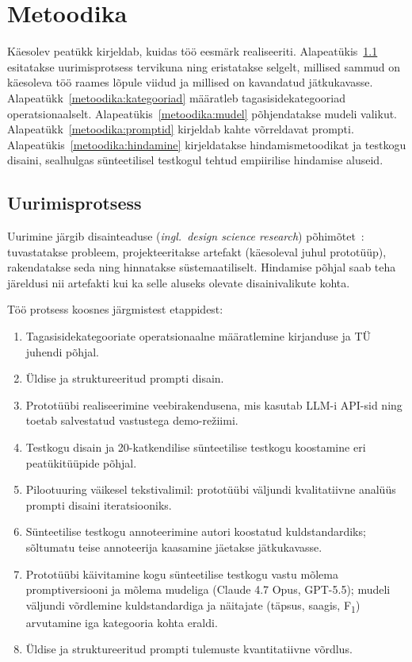\section{Metoodika} \label{metoodika}

Käesolev peatükk kirjeldab, kuidas töö eesmärk realiseeriti. Alapeatükis~\ref{metoodika:protsess} esitatakse uurimisprotsess tervikuna ning eristatakse selgelt, millised sammud on käesoleva töö raames lõpule viidud ja millised on kavandatud jätkukavasse. Alapeatükk~\ref{metoodika:kategooriad} määratleb tagasisidekategooriad operatsionaalselt. Alapeatükis~\ref{metoodika:mudel} põhjendatakse mudeli valikut. Alapeatükk~\ref{metoodika:promptid} kirjeldab kahte võrreldavat prompti. Alapeatükis~\ref{metoodika:hindamine} kirjeldatakse hindamismetoodikat ja testkogu disaini, sealhulgas sünteetilisel testkogul tehtud empiirilise hindamise aluseid.

\subsection{Uurimisprotsess} \label{metoodika:protsess}

Uurimine järgib disain\-teaduse (\emph{ingl.\ design science research}) põhimõtet~\cite{hevner_design_2004}: tuvastatakse probleem, projekteeritakse artefakt (käesoleval juhul prototüüp), rakendatakse seda ning hinnatakse süstemaatiliselt. Hindamise põhjal saab teha järeldusi nii artefakti kui ka selle aluseks olevate disainivalikute kohta.

Töö protsess koosnes järgmistest etappidest:
\begin{enumerate}
    \item Tagasisidekategooriate operatsionaalne määratlemine kirjanduse ja TÜ juhendi põhjal.
    \item Üldise ja struktureeritud prompti disain.
    \item Prototüübi realiseerimine veebirakendusena, mis kasutab LLM-i API-sid ning toetab salvestatud vastustega demo-režiimi.
    \item Testkogu disain ja 20-katkendilise sünteetilise testkogu koostamine eri peatükitüüpide põhjal.
    \item Pilootuuring väikesel tekstivalimil: prototüübi väljundi kvalitatiivne analüüs prompti disaini iteratsiooniks.
    \item Sünteetilise testkogu annoteerimine autori koostatud kuldstandardiks; sõltumatu teise annoteerija kaasamine jäetakse jätkukavasse.
    \item Prototüübi käivitamine kogu sünteetilise testkogu vastu mõlema promptiversiooni ja mõlema mudeliga (Claude 4.7 Opus, GPT-5.5); mudeli väljundi võrdlemine kuldstandardiga ja näitajate (täpsus, saagis, F\textsubscript{1}) arvutamine iga kategooria kohta eraldi.
    \item Üldise ja struktureeritud prompti tulemuste kvantitatiivne võrdlus.
\end{enumerate}

